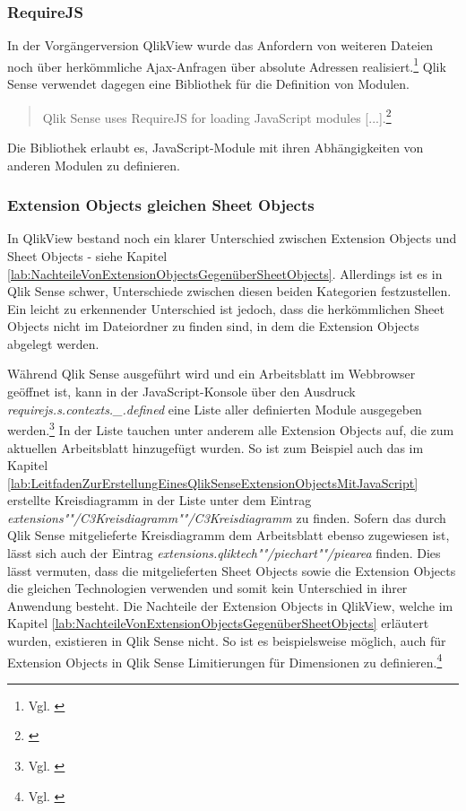 \subsubsection{RequireJS}

In der Vorgängerversion QlikView wurde das Anfordern von weiteren Dateien noch über herkömmliche Ajax-Anfragen über absolute Adressen realisiert.\footnote{Vgl. \cite{QlikViewAjaxJavaScriptLibraryLoadExtensionScripts}} Qlik Sense verwendet dagegen eine Bibliothek für die Definition von Modulen. 

\begin{quote}
Qlik Sense uses RequireJS for loading JavaScript modules [...].\footnote{\cite{QlikSenseWorkbenchRequirementsAndAssumptions}}
\end{quote}

Die Bibliothek erlaubt es, JavaScript-Module mit ihren Abhängig\-keiten von anderen Modulen zu definieren.

\subsubsection{Extension Objects gleichen Sheet Objects}

In QlikView bestand noch ein klarer Unterschied zwischen Extension Objects und Sheet Objects - siehe Kapitel \ref{lab:NachteileVonExtensionObjectsGegenüberSheetObjects}. Allerdings ist es in Qlik Sense schwer, Unterschiede zwischen diesen beiden Kategorien festzustellen. Ein leicht zu erkennender Unterschied ist jedoch, dass die herkömmlichen Sheet Objects nicht im Datei\-ordner zu finden sind, in dem die Extension Objects abgelegt werden.

Während Qlik Sense ausgeführt wird und ein Arbeitsblatt im Webbrowser geöffnet ist, kann in der JavaScript-Konsole über den Ausdruck \textit{requirejs.s.contexts.\_.defined} eine Liste aller definierten Module ausgegeben werden.\footnote{Vgl. \cite{FiveHelpfulTipsWhenUsingRequireJSTechPro}} In der Liste tauchen unter anderem alle Extension Objects auf, die zum aktuellen Arbeitsblatt hinzugefügt wurden. So ist zum Beispiel auch das im Kapitel \ref{lab:LeitfadenZurErstellungEinesQlikSenseExtensionObjectsMitJavaScript} erstellte Kreisdiagramm in der Liste unter dem Eintrag \textit{extensions""/C3Kreisdiagramm""/C3Kreisdiagramm} zu finden. Sofern das durch Qlik Sense mitgelieferte Kreisdiagramm dem Arbeitsblatt ebenso zugewiesen ist, lässt sich auch der Eintrag \textit{extensions.qliktech""/piechart""/piearea} finden. Dies lässt vermuten, dass die mitgelieferten Sheet Objects sowie die Extension Objects die gleichen Technologien verwenden und somit kein Unterschied in ihrer Anwendung besteht. Die Nachteile der Extension Objects in QlikView, welche im Kapitel \ref{lab:NachteileVonExtensionObjectsGegenüberSheetObjects} erläutert wurden, existieren in Qlik Sense nicht. So ist es beispielsweise möglich, auch für Extension Objects in Qlik Sense Limitierungen für Dimensionen zu definieren.\footnote{Vgl. \cite[S. 89 ff.]{o2014qlik}}


